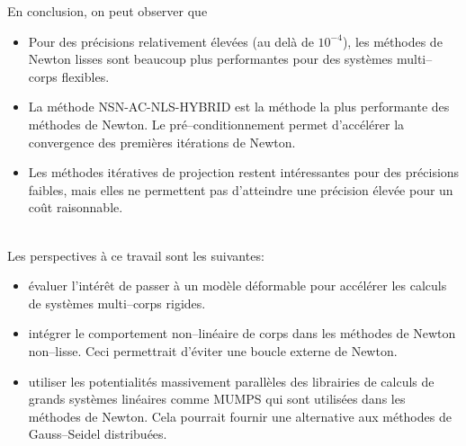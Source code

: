 \documentclass{CSMA2017}
\newcommand\ndm[1]{}
\begin{document}
En conclusion, on peut observer que 
\begin{itemize}
\item Pour des précisions relativement élevées (au delà de $10^{-4}$), les méthodes de Newton lisses sont beaucoup plus performantes pour des systèmes multi--corps flexibles.
\item La méthode {\sf\small NSN-AC-NLS-HYBRID} est la méthode la plus performante des méthodes de Newton. Le pré--conditionnement permet d'accélérer la convergence des premières itérations de Newton.

\item Les méthodes itératives de projection restent intéressantes pour des précisions faibles, mais elles ne permettent pas d'atteindre une précision élevée pour un coût raisonnable.
\end{itemize}
\ \\
Les perspectives à ce travail sont les suivantes:
\begin{itemize}
\item évaluer l'intérêt de passer à un modèle déformable pour accélérer les calculs de systèmes multi--corps rigides. \ndm{{c'était dans l'intro mais on a pas eu le temps ==> reprendre l'intro} }
\item intégrer le comportement non--linéaire de corps dans les méthodes de Newton non--lisse. Ceci permettrait d'éviter une boucle externe de Newton.
\item utiliser les potentialités massivement parallèles des librairies de calculs de grands systèmes linéaires comme MUMPS qui sont utilisées dans les méthodes de Newton. Cela pourrait fournir une alternative aux méthodes de Gauss--Seidel distribuées.
\end{itemize}










\end{document}
